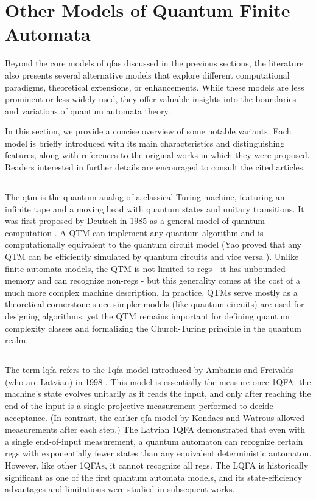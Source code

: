 \section{Other Models of Quantum Finite Automata}
\label{sec:other-models}

Beyond the core models of \glspl{qfa} discussed in the previous sections, the literature also presents several alternative models that explore different computational paradigms, theoretical extensions, or enhancements. While these models are less prominent or less widely used, they offer valuable insights into the boundaries and variations of quantum automata theory.

In this section, we provide a concise overview of some notable variants. Each model is briefly introduced with its main characteristics and distinguishing features, along with references to the original works in which they were proposed. Readers interested in further details are encouraged to consult the cited articles.

\subsection{} 
The \gls{qtm} is the quantum analog of a classical Turing machine, featuring an infinite tape and a moving head with quantum states and unitary transitions. It was first proposed by Deutsch in 1985 as a general model of quantum computation \cite{deutsch1985quantum}. A QTM can implement any quantum algorithm and is computationally equivalent to the quantum circuit model (Yao proved that any QTM can be efficiently simulated by quantum circuits and vice versa \cite{yao1993quantum}). Unlike finite automata models, the QTM is not limited to \glspl{reg} - it has unbounded memory and can recognize non-\glspl{reg} - but this generality comes at the cost of a much more complex machine description. In practice, QTMs serve mostly as a theoretical cornerstone since simpler models (like quantum circuits) are used for designing algorithms, yet the QTM remains important for defining quantum complexity classes and formalizing the Church-Turing principle in the quantum realm.

\subsection{} 
The term \gls{lqfa} refers to the \gls{1qfa} model introduced by Ambainis and Freivalds (who are Latvian) in 1998 \cite{ambainis19981}. This model is essentially the measure-once 1QFA: the machine's state evolves unitarily as it reads the input, and only after reaching the end of the input is a single projective measurement performed to decide acceptance. (In contrast, the earlier \gls{qfa} model by Kondacs and Watrous allowed measurements after each step.) The Latvian 1QFA demonstrated that even with a single end-of-input measurement, a quantum automaton can recognize certain \glspl{reg} with exponentially fewer states than any equivalent deterministic automaton. However, like other 1QFAs, it cannot recognize all \glspl{reg}. The LQFA is historically significant as one of the first quantum automata models, and its state-efficiency advantages and limitations were studied in subsequent works.

